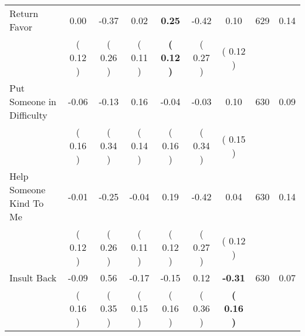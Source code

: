 \begin{tabular}{lcccccccc}
Return Favor &      0.00 &     -0.37 &      0.02 & \textbf{     0.25} &     -0.42 &      0.10 & 629 &       0.14 \\ 
 & (     0.12 ) & (     0.26 ) & (     0.11 ) & \textbf{(     0.12 )} & (     0.27 ) & (     0.12 ) & \\
Put Someone in Difficulty &     -0.06 &     -0.13 &      0.16 &     -0.04 &     -0.03 &      0.10 & 630 &       0.09 \\ 
 & (     0.16 ) & (     0.34 ) & (     0.14 ) & (     0.16 ) & (     0.34 ) & (     0.15 ) & \\
Help Someone Kind To Me &     -0.01 &     -0.25 &     -0.04 &      0.19 &     -0.42 &      0.04 & 630 &       0.14 \\ 
 & (     0.12 ) & (     0.26 ) & (     0.11 ) & (     0.12 ) & (     0.27 ) & (     0.12 ) & \\
Insult Back &     -0.09 &      0.56 &     -0.17 &     -0.15 &      0.12 & \textbf{    -0.31} & 630 &       0.07 \\ 
 & (     0.16 ) & (     0.35 ) & (     0.15 ) & (     0.16 ) & (     0.36 ) & \textbf{(     0.16 )} & \\
\bottomrule
\end{tabular}
